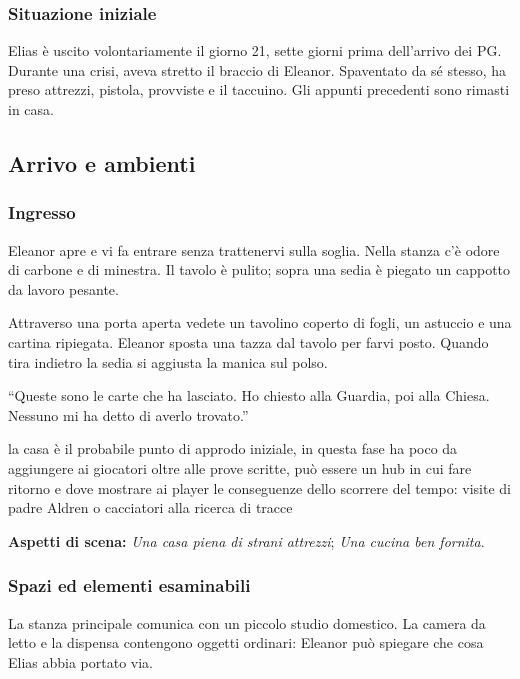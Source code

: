 \documentclass[11pt,a4paper]{article}
\newcommand{\aspect}[1]{\textit{\textcolor{blood}{#1}}}
\begin{document}
\subsubsection{Situazione iniziale}
Elias è uscito volontariamente il giorno 21, sette giorni prima dell'arrivo dei PG. Durante una crisi, aveva stretto il braccio di Eleanor. Spaventato da sé stesso, ha preso attrezzi, pistola, provviste e il taccuino. Gli appunti precedenti sono rimasti in casa.

\subsection{Arrivo e ambienti}
\subsubsection{Ingresso}
\begin{readaloud}
Eleanor apre e vi fa entrare senza trattenervi sulla soglia. Nella stanza c'è odore di carbone e di minestra. Il tavolo è pulito; sopra una sedia è piegato un cappotto da lavoro pesante.

Attraverso una porta aperta vedete un tavolino coperto di fogli, un astuccio e una cartina ripiegata. Eleanor sposta una tazza dal tavolo per farvi posto. Quando tira indietro la sedia si aggiusta la manica sul polso.

``Queste sono le carte che ha lasciato. Ho chiesto alla Guardia, poi alla Chiesa. Nessuno mi ha detto di averlo trovato.''
\end{readaloud}

\begin{gmbox}
la casa è il probabile punto di approdo iniziale, in questa fase ha poco da aggiungere ai giocatori oltre alle prove scritte, può essere un hub in cui fare ritorno e dove mostrare ai player le conseguenze dello scorrere del tempo: visite di padre Aldren o cacciatori alla ricerca di tracce
\end{gmbox}

\textbf{Aspetti di scena:} \aspect{Una casa piena di strani attrezzi}; \aspect{Una cucina ben fornita}.

\subsubsection{Spazi ed elementi esaminabili}
La stanza principale comunica con un piccolo studio domestico. La camera da letto e la dispensa contengono oggetti ordinari: Eleanor può spiegare che cosa Elias abbia portato via.
\end{document}
